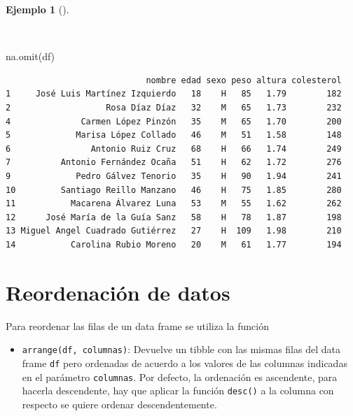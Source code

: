 \documentclass[
  spanish,
  a4paper,
]{scrreport}
\newenvironment{Shaded}{\begin{snugshade}}{\end{snugshade}}
\newcommand{\FunctionTok}[1]{\textcolor[rgb]{0.28,0.35,0.67}{#1}}
\newcommand{\NormalTok}[1]{\textcolor[rgb]{0.00,0.23,0.31}{#1}}
\providecommand{\tightlist}{%
  \setlength{\itemsep}{0pt}\setlength{\parskip}{0pt}}
\theoremstyle{definition}
\theoremstyle{definition}
\newtheorem{example}{Ejemplo}[chapter]
\theoremstyle{remark}
\begin{document}
\begin{example}[]\protect\hypertarget{exm-filter-na}{}\label{exm-filter-na}

~

\begin{Shaded}
\begin{Highlighting}[]
\FunctionTok{na.omit}\NormalTok{(df)}
\end{Highlighting}
\end{Shaded}

\begin{verbatim}
                            nombre edad sexo peso altura colesterol
1     José Luis Martínez Izquierdo   18    H   85   1.79        182
2                   Rosa Díaz Díaz   32    M   65   1.73        232
4              Carmen López Pinzón   35    M   65   1.70        200
5             Marisa López Collado   46    M   51   1.58        148
6                Antonio Ruiz Cruz   68    H   66   1.74        249
7          Antonio Fernández Ocaña   51    H   62   1.72        276
9             Pedro Gálvez Tenorio   35    H   90   1.94        241
10         Santiago Reillo Manzano   46    H   75   1.85        280
11           Macarena Álvarez Luna   53    M   55   1.62        262
12      José María de la Guía Sanz   58    H   78   1.87        198
13 Miguel Angel Cuadrado Gutiérrez   27    H  109   1.98        210
14           Carolina Rubio Moreno   20    M   61   1.77        194
\end{verbatim}

\end{example}

\section{Reordenación de datos}\label{reordenaciuxf3n-de-datos}

Para reordenar las filas de un data frame se utiliza la función

\begin{itemize}
\tightlist
\item
  \texttt{arrange(df,\ columnas)}: Devuelve un tibble con las mismas
  filas del data frame \texttt{df} pero ordenadas de acuerdo a los
  valores de las columnas indicadas en el parámetro \texttt{columnas}.
  Por defecto, la ordenación es ascendente, para hacerla descendente,
  hay que aplicar la función \texttt{desc()} a la columna con respecto
  se quiere ordenar descendentemente.
\end{itemize}
\end{document}
